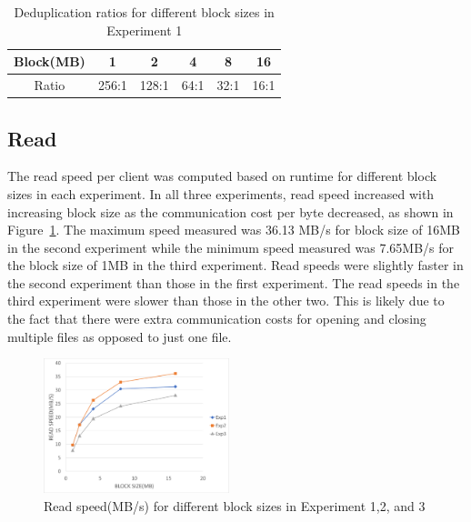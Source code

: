 \documentclass[11pt,twocolumn]{article}
\begin{document}
\begin{table}[H]
\begin{center}
\begin{center}
\begin{tabular}{ |c|c|c|c|c|c| } 
\hline
Block(MB) & 1 & 2 & 4 & 8 & 16 \\
\hline
Ratio & 256:1 & 128:1 & 64:1 & 32:1 & 16:1\\
\hline
\end{tabular}
\end{center}

\caption{\label{dedupresults} Deduplication ratios for different block sizes in Experiment 1}
\end{center}
\end{table}

\subsection{Read}\label{results:read}
The read speed per client was computed based on runtime for different block sizes in each experiment. In all three experiments, read speed increased with increasing block size as the communication cost per byte decreased, as shown in Figure~\ref{read_speed}. The maximum speed measured was 36.13 MB/s for block size of 16MB in the second experiment while the minimum speed measured was 7.65MB/s for the block size of 1MB in the third experiment. Read speeds were slightly faster in the second experiment than those in the first experiment. The read speeds in the third experiment were slower than those in the other two. This is likely due to the fact that there were extra communication costs for opening and closing multiple files as opposed to just one file.

\begin{figure}[H]
  \center
  \includegraphics[width=0.48\textwidth]{read_speed.png}
  \caption{{\label{read_speed} }Read speed(MB/s) for different block sizes in Experiment 1,2, and 3 }
\end{figure}
\end{document}
